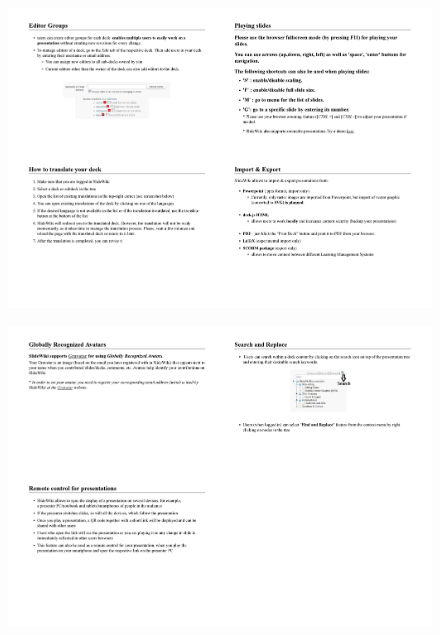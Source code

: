 \begin{figure}
    \centering
    \includegraphics[width=\columnwidth]{images/page4.pdf}
    
\end{figure}

\begin{figure}
    \centering
    \includegraphics[width=\columnwidth]{images/page5.pdf}
    
\end{figure}

